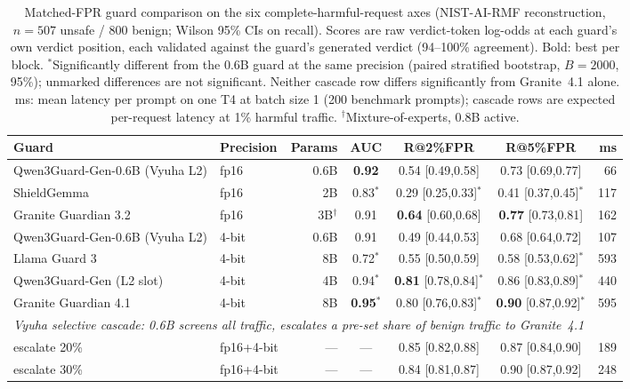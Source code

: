 \documentclass[11pt]{article}
\begin{document}
\begin{table}[t]
\centering\small
\begin{tabular}{llrcccr}
\toprule
Guard & Precision & Params & AUC & R@2\%FPR & R@5\%FPR & ms \\
\midrule
Qwen3Guard-Gen-0.6B (Vyuha L2) & fp16 & 0.6B & \textbf{0.92} & 0.54 [0.49,0.58] & 0.73 [0.69,0.77] & 66 \\
ShieldGemma            & fp16 & 2B   & 0.83$^{*}$ & 0.29 [0.25,0.33]$^{*}$ & 0.41 [0.37,0.45]$^{*}$ & 117 \\
Granite Guardian 3.2   & fp16 & 3B$^\dagger$ & 0.91 & \textbf{0.64} [0.60,0.68] & \textbf{0.77} [0.73,0.81] & 162 \\
\midrule
Qwen3Guard-Gen-0.6B (Vyuha L2) & 4-bit & 0.6B & 0.91 & 0.49 [0.44,0.53] & 0.68 [0.64,0.72] & 107 \\
Llama Guard 3          & 4-bit & 8B   & 0.72$^{*}$ & 0.55 [0.50,0.59] & 0.58 [0.53,0.62]$^{*}$ & 593 \\
Qwen3Guard-Gen (L2 slot) & 4-bit & 4B & 0.94$^{*}$ & \textbf{0.81} [0.78,0.84]$^{*}$ & 0.86 [0.83,0.89]$^{*}$ & 440 \\
Granite Guardian 4.1   & 4-bit & 8B   & \textbf{0.95}$^{*}$ & 0.80 [0.76,0.83]$^{*}$ & \textbf{0.90} [0.87,0.92]$^{*}$ & 595 \\
\midrule
\multicolumn{7}{l}{\emph{Vyuha selective cascade: 0.6B screens all traffic, escalates a pre-set share of benign traffic to Granite~4.1}} \\
\quad escalate 20\% & fp16+4-bit & --- & --- & 0.85 [0.82,0.88] & 0.87 [0.84,0.90] & 189 \\
\quad escalate 30\% & fp16+4-bit & --- & --- & 0.84 [0.81,0.87] & 0.90 [0.87,0.92] & 248 \\
\bottomrule
\end{tabular}
\caption{Matched-FPR guard comparison on the six complete-harmful-request axes (NIST-AI-RMF
reconstruction, $n{=}507$ unsafe / $800$ benign; Wilson 95\% CIs on recall). Scores are raw verdict-token
log-odds at each guard's own verdict position, each validated against the guard's generated verdict
(94--100\% agreement). Bold: best per block. $^{*}$Significantly different from the 0.6B guard at the
same precision (paired stratified bootstrap, $B{=}2000$, 95\%); unmarked differences are not significant.
Neither cascade row differs significantly from Granite~4.1 alone. ms: mean latency per prompt on one T4 at batch size 1 (200 benchmark prompts); cascade rows are expected per-request latency at 1\% harmful traffic. $^\dagger$Mixture-of-experts, 0.8B active.}
\label{tab:baselines}
\end{table}
\end{document}
